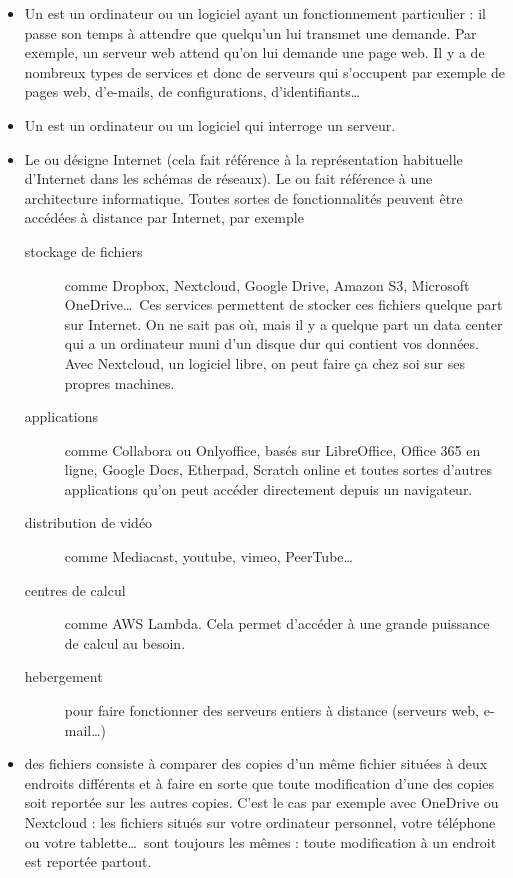 \documentclass[10pt,a4paper]{report}
\begin{document}
\begin{itemize}
	\item Un  est un ordinateur ou un logiciel ayant un fonctionnement particulier : il passe son temps à attendre que quelqu'un lui transmet une demande. Par exemple, un serveur web attend qu'on lui demande une page web. Il y a de nombreux types de services et donc de serveurs qui s'occupent par exemple de pages web, d'e-mails, de configurations, d'identifiants\dots 
	\item Un  est un ordinateur ou un logiciel qui interroge un serveur.
	\item Le  ou  désigne Internet (cela fait référence à la représentation habituelle d'Internet dans les schémas de réseaux). Le  ou  fait référence à une architecture informatique. Toutes sortes de fonctionnalités peuvent être accédées à distance par Internet, par exemple
		\begin{description}
			\item[stockage de fichiers] comme Dropbox, Nextcloud, Google Drive, Amazon S3, Microsoft OneDrive\dots \ Ces services permettent de stocker ces fichiers quelque part sur Internet. On ne sait pas où, mais il y a quelque part un data center qui a un ordinateur muni d'un disque dur qui contient vos données. Avec Nextcloud, un logiciel libre, on peut faire ça chez soi sur ses propres machines.
			\item[applications] comme Collabora ou Onlyoffice, basés sur LibreOffice, Office 365 en ligne, Google Docs, Etherpad, Scratch online et toutes sortes d'autres applications qu'on peut accéder directement depuis un navigateur.
			\item[distribution de vidéo] comme Mediacast, youtube, vimeo, PeerTube\dots
			\item[centres de calcul] comme AWS Lambda. Cela permet d'accéder à une grande puissance de calcul au besoin.
			\item[hebergement] pour faire fonctionner des serveurs entiers à distance (serveurs web, e-mail\dots)
		\end{description}
	\item {} des fichiers consiste à comparer des copies d'un même fichier situées à deux endroits différents et à faire en sorte que toute modification d'une des copies soit reportée sur les autres copies. C'est le cas par exemple avec OneDrive ou Nextcloud : les fichiers situés sur votre ordinateur personnel, votre téléphone ou votre tablette\dots \ sont toujours les mêmes : toute modification à un endroit est reportée partout. \\[1ex]

\end{itemize}
\end{document}
